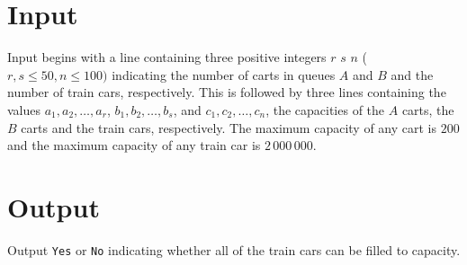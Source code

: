 \documentclass{article}
\begin{document}
\section*{Input}
Input begins with a line containing three positive integers $r$ $s$ $n$ ($r,s \leq 50, n \leq 100)$ indicating the number of carts in queues $A$ and $B$ and the number of train cars, respectively. This is followed by three lines containing the values $a_1, a_2, \ldots, a_r$, $b_1, b_2, \ldots, b_s$, and $c_1, c_2, \ldots, c_n$, the capacities of the $A$ carts, the $B$ carts and the train cars, respectively.  The maximum capacity of any cart is $200$ and the maximum capacity of any train car is $2\,000\,000$. 

\section*{Output}
Output {\tt Yes} or {\tt No} indicating whether all of the train cars can be filled to capacity.
\end{document}
